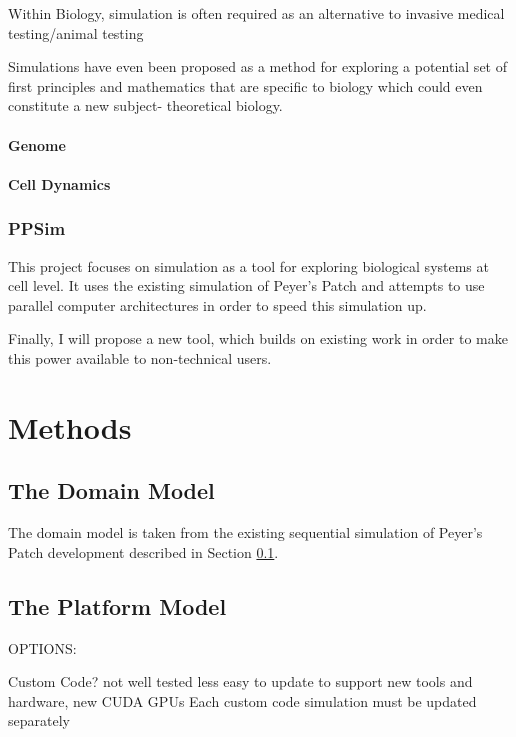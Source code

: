 \documentclass{UoYCSproject}
\begin{document}
Within Biology, simulation is often required as an alternative to invasive medical testing/animal testing


Simulations have even been proposed as a method for exploring a potential set of first principles and mathematics that are specific to biology which could even constitute a new subject- theoretical biology\cite{rise_article}.

\subsubsection{Genome}


\subsubsection{Cell Dynamics}


\subsection{PPSim}
\label{ppsim}
This project focuses on simulation as a tool for exploring biological systems at cell level. It uses the existing simulation of Peyer's Patch\cite{kieran_thesis} and attempts to use parallel computer architectures in order to speed this simulation up. %

Finally, I will propose a new tool, which builds on existing work in order to make this power available to non-technical users.

\chapter{Methods}
\label{methods}
\section{The Domain Model}
The domain model is taken from the existing sequential simulation of Peyer's Patch development described in Section \ref{ppsim}.

\section{The Platform Model}
OPTIONS:

Custom Code?\cite{phil_diss}
	not well tested
	less easy to update to support new tools and hardware, new CUDA GPUs
		Each custom code simulation must be updated separately
\end{document}
